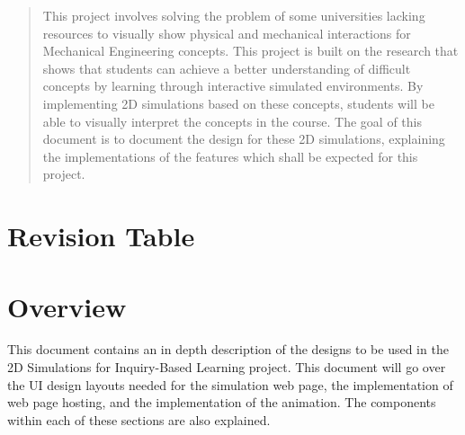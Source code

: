 \begin{titlepage}
\begin{singlespace}
\begin{abstract}
This project involves solving the problem of some universities lacking resources to visually show physical and mechanical interactions for Mechanical Engineering concepts.
This project is built on the research that shows that students can achieve a better understanding of difficult concepts by learning through interactive simulated environments.
By implementing 2D simulations based on these concepts, students will be able to visually interpret the concepts in the course.
The goal of this document is to document the design for these 2D simulations, explaining the implementations of the features which shall be expected for this project.
        \end{abstract}     
    \end{singlespace}
\end{titlepage}
\newpage
\clearpage





\section{Revision Table}


\section{Overview}
This document contains an in depth description of the designs to be used in the 2D Simulations for Inquiry-Based Learning project. This document will go over the UI design layouts needed for the simulation web page, the implementation of web page hosting, and the implementation of the animation. The components within each of these sections are also explained. 

